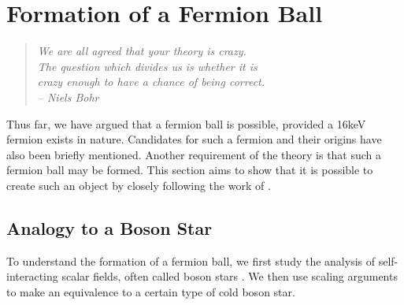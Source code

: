 \section{Formation of a Fermion Ball}
\begin{quotation}
	\raggedleft \it
	We are all agreed that your theory is crazy.\\
	The question which divides us is whether it is\\
	crazy enough to have a chance of being correct.\\
	-- Niels Bohr
\end{quotation}
Thus far, we have argued that a fermion ball is possible, provided a 16keV fermion exists in nature. Candidates for such a fermion
and their origins have also been briefly mentioned. Another requirement of the theory is that such a fermion ball may be formed. This
section aims to show that it is possible to create such an object by closely following the work of \cite{ref_formation}.

\subsection{Analogy to a Boson Star}
To understand the formation of a fermion ball, we first study the analysis of self-interacting scalar fields, often called boson stars
\cite{ref_bosonform}.
We then use scaling arguments to make an equivalence to a certain type of cold boson star.

